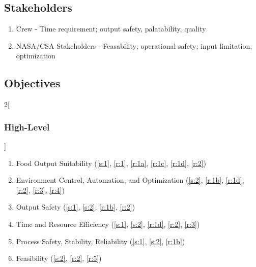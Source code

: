 \documentclass{../tex/report}
\begin{document}
\clearpage
\subsection{Stakeholders}
\label{sec:stakeholders}

\begin{enumerate}[label=S\arabic*., ref=S\arabic*]
    \item \label{s:1} Crew - Time requirement; output safety, palatability, quality
    \item \label{s:2} NASA/CSA Stakeholders - Feasability; operational safety; input limitation, optimization
\end{enumerate}

\subsection{Objectives}
\label{sec:objectives}

\begin{multicols}{2}[\subsubsection{High-Level}\label{sec:hlos}]
    \begin{enumerate}[label=HL\arabic*., ref=HL\arabic*]
        \item \label{hl:output} Food Output Suitability                                 \hfill (\ref{s:1}, \ref{r:1}, \ref{r:1a}, \ref{r:1c}, \ref{r:1d}, \ref{r:2})
        \item \label{hl:environment} Environment Control, Automation, and Optimization  \hfill (\ref{s:2}, \ref{r:1b}, \ref{r:1d}, \ref{r:2}, \ref{r:3}, \ref{r:4})
        \item \label{hl:outputsafety} Output Safety                                     \hfill (\ref{s:1}, \ref{s:2}, \ref{r:1b}, \ref{r:2})
        \item \label{hl:efficiency} Time and Resource Efficiency                        \hfill (\ref{s:1}, \ref{s:2}, \ref{r:1d}, \ref{r:2}, \ref{r:3})
        \item \label{hl:safety} Process Safety, Stability, Reliability                  \hfill (\ref{s:1}, \ref{s:2}, \ref{r:1b})
        \item \label{hl:feasibility} Feasibility                                        \hfill (\ref{s:2}, \ref{r:2}, \ref{r:5})
    \end{enumerate}
\end{multicols}
\end{document}
